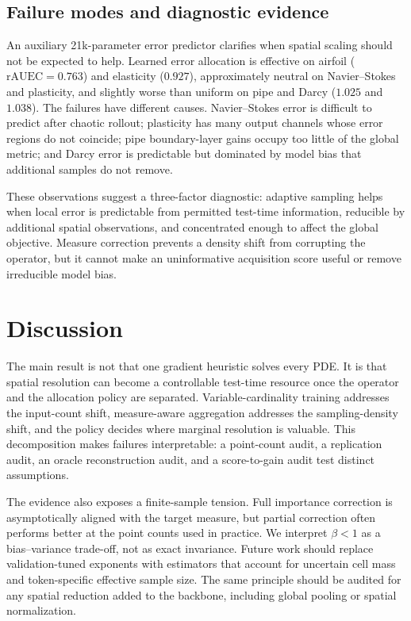 \documentclass{article}
\newcommand{\rauec}{\mathrm{rAUEC}}
\begin{document}
\subsection{Failure modes and diagnostic evidence}

An auxiliary 21k-parameter error predictor clarifies when spatial scaling should
not be expected to help. Learned error allocation is effective on airfoil
($\rauec=0.763$) and elasticity ($0.927$), approximately neutral on
Navier--Stokes and plasticity, and slightly worse than uniform on pipe and Darcy
($1.025$ and $1.038$). The failures have different causes. Navier--Stokes error
is difficult to predict after chaotic rollout; plasticity has many output
channels whose error regions do not coincide; pipe boundary-layer gains occupy
too little of the global metric; and Darcy error is predictable but dominated
by model bias that additional samples do not remove.

These observations suggest a three-factor diagnostic: adaptive sampling helps
when local error is predictable from permitted test-time information, reducible
by additional spatial observations, and concentrated enough to affect the
global objective. Measure correction prevents a density shift from corrupting
the operator, but it cannot make an uninformative acquisition score useful or
remove irreducible model bias.

\section{Discussion}

The main result is not that one gradient heuristic solves every PDE. It is that
spatial resolution can become a controllable test-time resource once the
operator and the allocation policy are separated. Variable-cardinality training
addresses the input-count shift, measure-aware aggregation addresses the
sampling-density shift, and the policy decides where marginal resolution is
valuable. This decomposition makes failures interpretable: a point-count audit,
a replication audit, an oracle reconstruction audit, and a score-to-gain audit
test distinct assumptions.

The evidence also exposes a finite-sample tension. Full importance correction
is asymptotically aligned with the target measure, but partial correction often
performs better at the point counts used in practice. We interpret $\beta<1$ as
a bias--variance trade-off, not as exact invariance. Future work should replace
validation-tuned exponents with estimators that account for uncertain cell mass
and token-specific effective sample size. The same principle should be audited
for any spatial reduction added to the backbone, including global pooling or
spatial normalization.
\end{document}
